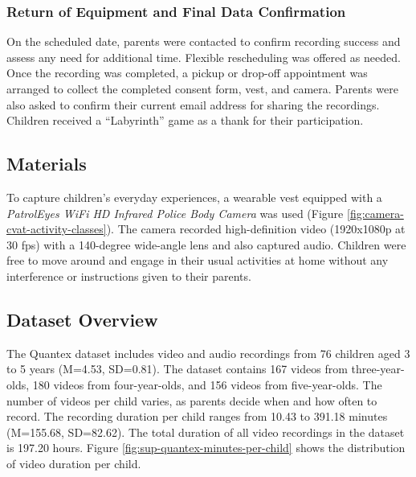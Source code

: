 \documentclass[
  man,floatsintext]{apa6}
\begin{document}
\subsubsection{Return of Equipment and Final Data Confirmation}\label{return-of-equipment-and-final-data-confirmation-1}

On the scheduled date, parents were contacted to confirm recording success and assess any need for additional time. Flexible rescheduling was offered as needed. Once the recording was completed, a pickup or drop-off appointment was arranged to collect the completed consent form, vest, and camera. Parents were also asked to confirm their current email address for sharing the recordings. Children received a ``Labyrinth'' game as a thank for their participation.

\subsection{Materials}\label{sup-materials}

To capture children's everyday experiences, a wearable vest equipped with a \emph{PatrolEyes WiFi HD Infrared Police Body Camera} was used (Figure \ref{fig:camera-cvat-activity-classes}). The camera recorded high-definition video (1920x1080p at 30 fps) with a 140-degree wide-angle lens and also captured audio. Children were free to move around and engage in their usual activities at home without any interference or instructions given to their parents.

\subsection{Dataset Overview}\label{sup-dataset}

The Quantex dataset includes video and audio recordings from 76 children aged 3 to 5 years (M=4.53, SD=0.81). The dataset contains 167 videos from three-year-olds, 180 videos from four-year-olds, and 156 videos from five-year-olds. The number of videos per child varies, as parents decide when and how often to record. The recording duration per child ranges from 10.43 to 391.18 minutes (M=155.68, SD=82.62). The total duration of all video recordings in the dataset is 197.20 hours. Figure \ref{fig:sup-quantex-minutes-per-child} shows the distribution of video duration per child.
\end{document}
